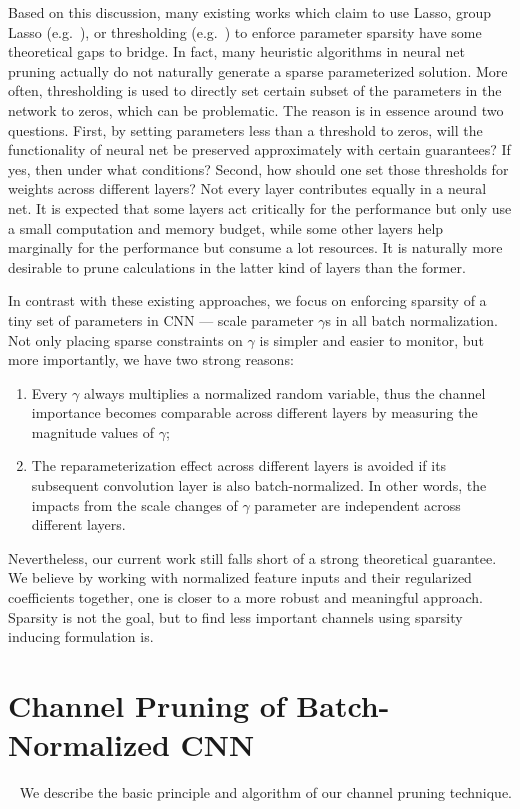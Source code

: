 \documentclass{article} %
\begin{document}
Based on this discussion, many existing works which claim to use Lasso, group Lasso (e.g.~\citet{wen2016learning,anwar2017structured}), or thresholding (e.g.~\citet{molchanov2016pruning}) to enforce parameter sparsity have some theoretical gaps to bridge. In fact, many heuristic algorithms in neural net pruning actually do not naturally generate a sparse parameterized solution. More often, thresholding is used to directly set certain subset of the parameters in the network to zeros, which can be problematic.
The reason is in essence around two questions.
First, by setting parameters less than a threshold to zeros, will the functionality of neural net be preserved approximately with certain guarantees? If yes, then under what conditions?
Second, how should one set those thresholds for weights across different layers?
Not every layer contributes equally in a neural net. It is expected that some layers act critically for the performance but only use a small computation and memory budget, while some other layers help marginally for the performance but consume a lot resources. It is naturally more desirable to prune calculations in the latter kind of layers than the former.

In contrast with these existing approaches, we focus on enforcing sparsity of a tiny set of parameters in CNN --- 
scale parameter $\gamma$s in all batch normalization. Not only placing sparse 
constraints on $\gamma$ is simpler and easier to monitor, but more importantly, we have two strong reasons: 
\begin{enumerate}
\item Every $\gamma$ always multiplies a normalized random variable, thus the channel importance
becomes comparable across different layers by measuring the magnitude values of $\gamma$;
\item The reparameterization effect across different layers is avoided if its subsequent convolution layer
is also batch-normalized. In other words, the impacts from the scale changes of $\gamma$ parameter 
are independent across different layers. 
\end{enumerate}

Nevertheless, our current work still falls short of a strong theoretical guarantee. We believe by working with normalized feature inputs and their regularized coefficients together, one is closer to a more robust and meaningful approach. Sparsity is not the goal, but to find less important channels using sparsity inducing formulation is. 

\section{Channel Pruning of Batch-Normalized CNN}~\label{sec:method}
We describe the basic principle and algorithm of our channel pruning technique.
\end{document}
